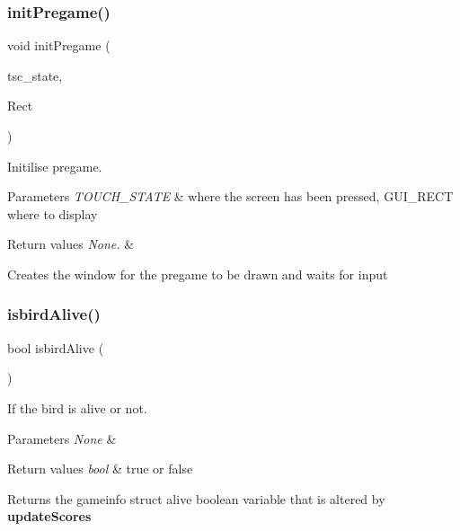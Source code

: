 \subsubsection{\texorpdfstring{init\+Pregame()}{initPregame()}}
{\footnotesize\ttfamily void init\+Pregame (\begin{DoxyParamCaption}\item[{T\+O\+U\+C\+H\+\_\+\+S\+T\+A\+TE}]{tsc\+\_\+state,  }\item[{G\+U\+I\+\_\+\+R\+E\+CT}]{Rect }\end{DoxyParamCaption})}



Initilise pregame. 


\begin{DoxyParams}{Parameters}
{\em T\+O\+U\+C\+H\+\_\+\+S\+T\+A\+TE} & where the screen has been pressed, G\+U\+I\+\_\+\+R\+E\+CT where to display \\
\hline
\end{DoxyParams}

\begin{DoxyRetVals}{Return values}
{\em None.} & \\
\hline
\end{DoxyRetVals}
Creates the window for the pregame to be drawn and waits for input \mbox{\label{group___flappy___bird_ga819692f49c5f4cc8981ef9509ac19630}} 
\subsubsection{\texorpdfstring{isbird\+Alive()}{isbirdAlive()}}
{\footnotesize\ttfamily bool isbird\+Alive (\begin{DoxyParamCaption}\item[{void}]{ }\end{DoxyParamCaption})}



If the bird is alive or not. 


\begin{DoxyParams}{Parameters}
{\em None} & \\
\hline
\end{DoxyParams}

\begin{DoxyRetVals}{Return values}
{\em bool} & true or false\\
\hline
\end{DoxyRetVals}
Returns the gameinfo struct alive boolean variable that is altered by {\bfseries update\+Scores} \mbox{\label{group___flappy___bird_ga4a1fc7e6be8da601d6c09b6bd54b2130}} 
